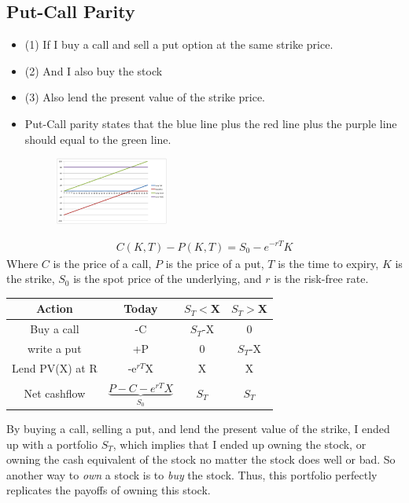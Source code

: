 \begin{multicols}{2}
\subsection{Put-Call Parity}
\begin{itemize}
    \item (1) If I buy a call and sell a put option at the same strike price. 
    \item (2) And I also buy the stock 
    \item (3) Also lend the present value of the strike price. 
    \item Put-Call parity states that the blue line plus the red line plus the purple line should equal to the green line. 
    \begin{figure}[H]
        \centering 
        \includegraphics[width =0.35\textwidth]{Figure/parity.png}
    \end{figure}
\end{itemize}
\begin{gather*}
    \boxed{C(K,T)-P(K,T) = S_0-e^{-rT}K}
\end{gather*}
Where $C$ is the price of a call, $P$ is the price of a put, $T$ is the time to expiry, $K$ is the strike, $S_0$ is the spot price of the underlying, and $r$ is the risk-free rate. 
\begin{table}[H]
    \begin{tabular}{c|c|c|c}
    Action & Today & $S_T<$X & $S_T>$X \\ \hline
    Buy a call & -C & $S_T$-X & 0 \\ 
    write a put & +P & 0 & $S_T$-X \\ 
    Lend PV(X) at R & -e$^{rT}$X & X & X \\
    Net cashflow & $\underbrace{P-C-e^{rT}X}_{S_0}$ & $S_T$ & $S_T$ \\
    \end{tabular}
\end{table}
\vspace*{-0.5cm}
By buying a call, selling a put, and lend the present value of the strike, I ended up with a portfolio $S_T$, which implies that I ended up owning the stock, or owning the cash equivalent of the stock no matter the stock does well or bad. So another way to \textit{own} a stock is to \textit{buy} the stock. Thus, this portfolio perfectly replicates the payoffs of owning this stock.


\end{multicols}
